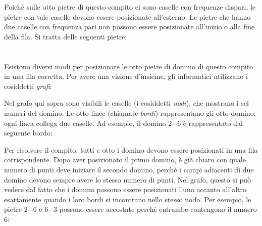 {{{\centering%
\par}

Poiché sulle otto pietre di questo compito ci sono caselle con frequenze dispari, le pietre con tale caselle devono essere posizionate all’esterno. Le pietre che hanno due caselle con frequenza pari non possono essere posizionate all’inizio o alla fine della fila. Si tratta delle seguenti pietre:

{\centering%
\par}



\section*{\BrochureItsInformatics}
Esistono diversi modi per posizionare le otto pietre di domino di questo compito in una fila corretta. Per avere una visione d’insieme, gli informatici utilizzano i cosiddetti \emph{grafi}:

{\centering%
\par}

Nel grafo qui sopra sono visibili le caselle (i cosiddetti \emph{nodi}), che mostrano i sei numeri del domino. Le otto linee (chiamate \emph{bordi}) rappresentano gli otto domino; ogni linea collega due caselle. Ad esempio, il domino 2$-6$ è rappresentato dal seguente bordo:

{\centering%
\par}

Per risolvere il compito, tutti e otto i domino devono essere posizionati in una fila corrispondente. Dopo aver posizionato il primo domino, è già chiaro con quale numero di punti deve iniziare il secondo domino, perché i campi adiacenti di due domino devono sempre avere lo stesso numero di punti. Nel grafo, questo si può vedere dal fatto che i domino possono essere posizionati l’uno accanto all’altro esattamente quando i loro bordi si incontrano nello stesso nodo. Per esempio, le pietre 2$-6$ e 6$-3$ possono essere accostate perché entrambe contengono il numero $6$:

{\centering%
\par}

}}

